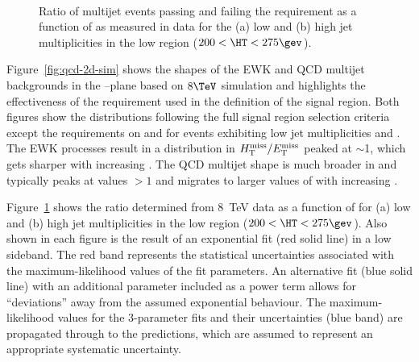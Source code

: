 \begin{figure}[!h]
  \centering
   \\
  \caption{Ratio of multijet events passing and failing the \mhtmet
    requirement as a function of \alphat as measured in data for the
    (a) low and (b) high jet multiplicities in
    the low \HT region ($200 < \HT < 275\gev$). }
  \label{fig:qcd-ratio-data}
\end{figure}

Figure~\ref{fig:qcd-2d-sim} shows the shapes of the EWK and QCD
multijet backgrounds in the \mhtmet--\alphat plane based on $8\TeV$
simulation and highlights the effectiveness of the \mhtmet requirement
used in the definition of the signal region. Both figures show the
distributions following the full signal region selection criteria
except the requirements on \alphat and \mhtmet for events exhibiting
low jet multiplicities and \scalht. The EWK processes result in a
distribution in $\mhtmet$ peaked at $\sim$1, which gets sharper with
increasing \alphat. The QCD multijet shape is much broader in \mhtmet
and typically peaks at values $>1$ and migrates to larger values of
\mhtmet with increasing \alphat. 

Figure~\ref{fig:qcd-ratio-data} shows the ratio \rmhtmet determined
from 8~TeV data as a function of \alphat for (a) low and (b) high jet
multiplicities in the low \HT region ($200 < \HT < 275\gev$).  Also
shown in each figure is the result of an exponential fit (red solid
line) in a low \alphat sideband. The red band represents the
statistical uncertainties associated with the maximum-likelihood
values of the fit parameters. An alternative fit (blue solid line)
with an additional parameter included as a power term allows for
``deviations'' away from the assumed exponential behaviour. The
maximum-likelihood values for the 3-parameter fits and their
uncertainties (blue band) are propagated through to the predictions,
which are assumed to represent an appropriate systematic uncertainty.

